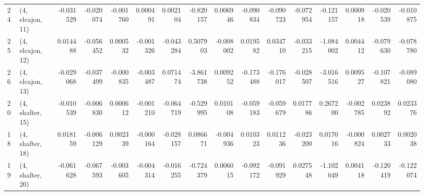 \begin{tabular}{llrrrrrrrrrrrrrr}
24 &  (4, elcajon, 11) & -0.031529 & -0.020074 &  -0.001760 &  0.000491 &  0.002104 &  -0.820157 &  0.006946 &  -0.090834 & -0.090723 & -0.072954 &  -0.121157 &  0.000918 & -0.020539 & -0.010875 \\
25 &  (4, elcajon, 12) &  0.014488 & -0.056452 &   0.000532 & -0.001326 & -0.043284 &   0.507903 & -0.008002 &   0.019582 &  0.034710 & -0.033215 &  -1.084002 &  0.004412 & -0.079630 & -0.078780 \\
26 &  (4, elcajon, 13) & -0.029068 & -0.037499 &  -0.000835 & -0.003487 &  0.071474 &  -3.861738 &  0.009252 &  -0.173488 & -0.176017 & -0.028507 &  -3.016516 &  0.009527 & -0.107821 & -0.089080 \\
20 &  (4, shafter, 15) & -0.010539 & -0.006830 &   0.000612 & -0.001210 & -0.064719 &  -0.529995 &  0.010108 &  -0.059183 & -0.059679 &  0.017786 &   0.267200 & -0.002785 &  0.023892 &  0.023376 \\
18 &  (4, shafter, 18) &  0.018159 & -0.006129 &   0.002339 & -0.000164 & -0.028157 &   0.086671 & -0.004936 &   0.010323 &  0.011236 & -0.023200 &   0.017016 & -0.000824 &  0.002733 &  0.002038 \\
19 &  (4, shafter, 20) & -0.061628 & -0.067593 &  -0.003605 & -0.004314 & -0.016255 &  -0.724379 &  0.006015 &  -0.092172 & -0.091929 &  0.027548 &  -1.102049 &  0.004118 & -0.120419 & -0.122074 \\
\bottomrule
\end{tabular}
